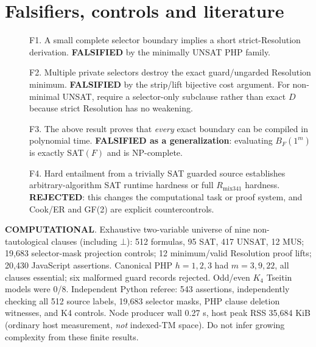 \documentclass[11pt]{article}
\begin{document}
\section*{Falsifiers, controls and literature}
\begin{description}
\item[] F1. A small complete selector boundary implies a short strict-Resolution derivation. \textbf{FALSIFIED} by the minimally UNSAT PHP family.
\item[] F2. Multiple private selectors destroy the exact guard/ungarded Resolution minimum. \textbf{FALSIFIED} by the strip/lift bijective cost argument. For non-minimal UNSAT, require a selector-only subclause rather than exact $D$ because strict Resolution has no weakening.
\item[] F3. The above result proves that \emph{every} exact boundary can be compiled in polynomial time. \textbf{FALSIFIED as a generalization}: evaluating $B_F(1^m)$ is exactly SAT$(F)$ and is NP-complete.
\item[] F4. Hard entailment from a trivially SAT guarded source establishes arbitrary-algorithm SAT runtime hardness or full $R_{\mathrm{mix341}}$ hardness. \textbf{REJECTED}: this changes the computational task or proof system, and Cook/ER and GF(2) are explicit countercontrols.
\end{description}
\noindent\textbf{COMPUTATIONAL}. Exhaustive two-variable universe of nine non-tautological clauses (including $\bot$): 512 formulas, 95 SAT, 417 UNSAT, 12 MUS; 19,683 selector-mask projection controls; 12 minimum/valid Resolution proof lifts; 20,430 JavaScript assertions. Canonical PHP $h=1,2,3$ had $m=3,9,22$, all clauses essential; six malformed guard records rejected. Odd/even $K_4$ Tseitin models were 0/8. Independent Python referee: 543 assertions, independently checking all 512 source labels, 19,683 selector masks, PHP clause deletion witnesses, and K4 controls. Node producer wall 0.27 s, host peak RSS 35,684 KiB (ordinary host measurement, \emph{not} indexed-TM space). Do not infer growing complexity from these finite results.
\end{document}
